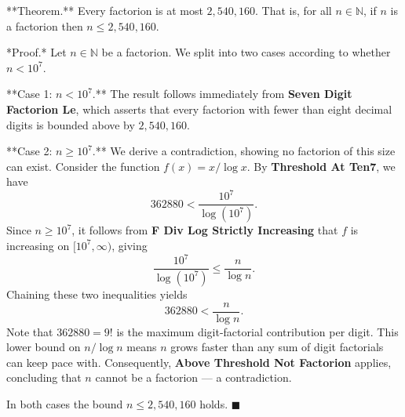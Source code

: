 **Theorem.** Every factorion is at most $2{,}540{,}160$. That is, for all $n \in \mathbb{N}$, if $n$ is a factorion then $n \leq 2{,}540{,}160$.

*Proof.* Let $n \in \mathbb{N}$ be a factorion. We split into two cases according to whether $n < 10^7$.

**Case 1: $n < 10^7$.** The result follows immediately from \textbf{Seven Digit Factorion Le}, which asserts that every factorion with fewer than eight decimal digits is bounded above by $2{,}540{,}160$.

**Case 2: $n \geq 10^7$.** We derive a contradiction, showing no factorion of this size can exist. Consider the function $f(x) = x / \log x$. By \textbf{Threshold At Ten7}, we have
$$362880 < \frac{10^7}{\log(10^7)}.$$
Since $n \geq 10^7$, it follows from \textbf{F Div Log Strictly Increasing} that $f$ is increasing on $[10^7, \infty)$, giving
$$\frac{10^7}{\log(10^7)} \leq \frac{n}{\log n}.$$
Chaining these two inequalities yields
$$362880 < \frac{n}{\log n}.$$
Note that $362880 = 9!$ is the maximum digit-factorial contribution per digit. This lower bound on $n/\!\log n$ means $n$ grows faster than any sum of digit factorials can keep pace with. Consequently, \textbf{Above Threshold Not Factorion} applies, concluding that $n$ cannot be a factorion — a contradiction.

In both cases the bound $n \leq 2{,}540{,}160$ holds. $\blacksquare$